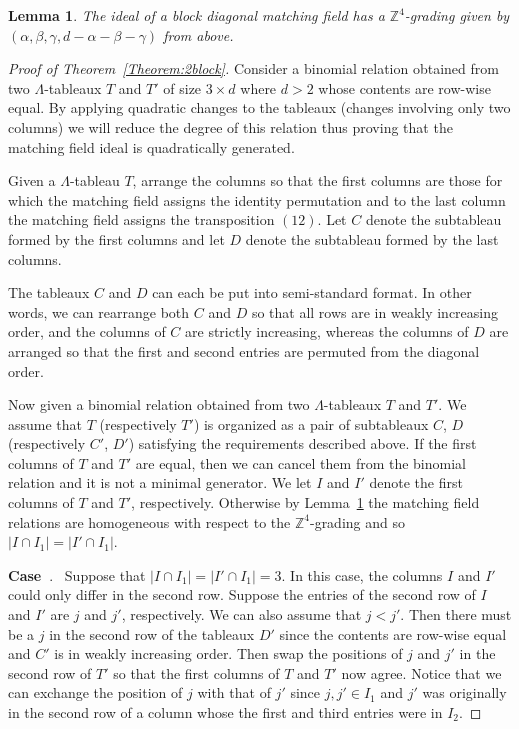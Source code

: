 \documentclass[10pt]{amsart}
\newtheorem{lemm}[theo]{Lemma}
\theoremstyle{definition}
\newcounter{cdrthm}
\newenvironment{enonce}[2][]{\refstepcounter{cdrthm}\par\smallskip\noindent\textbf{#2~\thecdrthm}.\ }{\par\smallskip}
\begin{document}
 
\begin{lemm}\label{lem:homo}
The ideal of a block diagonal matching field
has a $\mathbb{Z}^4$-grading given by $(\alpha, \beta,\gamma, d-\alpha-\beta-\gamma)$
from above. 
 \end{lemm}
 
 
 

\begin{proof}[Proof of Theorem~\ref{Theorem:2block}]

Consider a binomial relation obtained from two $\Lambda$-tableaux $T$ and $T'$ of size $3 \times d$ where $d >2$ whose contents are row-wise equal. By applying quadratic changes to the tableaux (changes involving only two columns) we will reduce the degree of this relation thus proving that the matching field ideal is quadratically generated. 

Given a $\Lambda$-tableau $T$, arrange the columns so that the first columns are those for which the matching field assigns the identity permutation and to the last column the matching field assigns the transposition $(12)$. Let $C$ denote the subtableau formed by the first columns and let $D$ denote the subtableau formed by the last columns. 

The tableaux $C$ and $D$ can each be put into semi-standard format. 
In other words, we can rearrange both $C$ and $D$ so that all rows are in weakly increasing order, and the columns of $C$ are strictly increasing, whereas the columns of $D$ are arranged so that the first and second entries are permuted from the diagonal order. 

Now given a binomial relation obtained from two $\Lambda$-tableaux $T$ and $T'$. We assume that $T$ (respectively $T'$) is organized as a pair of subtableaux $C$, $D$ (respectively $C'$, $D'$) satisfying the requirements described above. 
 If the first columns of $T$ and $T'$ are equal, then we can cancel them from the binomial relation and it is not a minimal generator. 
 We let $I$ and $I'$ denote the first columns of $T$ and $T'$, respectively. 
Otherwise by Lemma~\ref{lem:homo} the matching field relations are homogeneous with respect to the $\mathbb{Z}^4$-grading and so $\lvert I \cap I_1 \rvert = \lvert I' \cap I_1\rvert$.

\let\oldthecdrthm\thecdrthm
\setcounter{cdrthm}{0}
\def\thecdrthm{}
\begin{enonce}[remark]{Case}\label{Case1}%
Suppose that $\lvert I \cap I_1 \rvert = \lvert I' \cap I_1\rvert = 3$. In this case, the columns $I$ and $I'$ could only differ in the second row. Suppose the entries of the second row of $I$ and $I'$ are $j $ and $j'$, respectively. We can also assume that $j <j'$. 
Then there must be a $j$ in the second row of the tableaux $D'$ since the contents are row-wise equal and $C'$ is in weakly increasing order. Then swap the positions of $j$ and $j'$ in the second row of $T'$ so that the first columns of $T$ and $T'$ now agree. Notice that we can exchange the position of $j$ with that of $j'$ since $j, j' \in I_1$ and $j'$ was originally in the second row of a column whose the first and third entries were in $I_2$. 
\end{enonce}


\end{proof}
\end{document}

